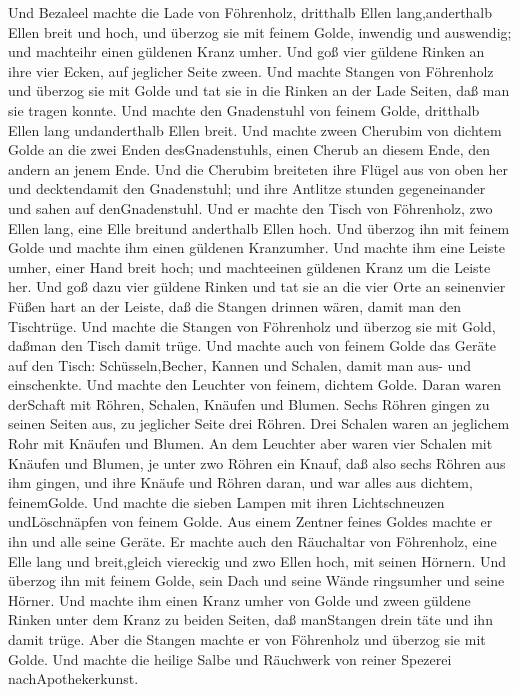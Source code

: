  Und Bezaleel machte die Lade von Föhrenholz, dritthalb
Ellen lang,anderthalb Ellen breit und hoch,  und überzog sie
mit feinem Golde, inwendig und auswendig; und machteihr einen güldenen
Kranz umher.  Und goß vier güldene Rinken an ihre vier
Ecken, auf jeglicher Seite zween.  Und machte Stangen von
Föhrenholz und überzog sie mit Golde  und tat sie in die
Rinken an der Lade Seiten, daß man sie tragen konnte.  Und
machte den Gnadenstuhl von feinem Golde, dritthalb Ellen lang
undanderthalb Ellen breit.  Und machte zween Cherubim von
dichtem Golde an die zwei Enden desGnadenstuhls,  einen
Cherub an diesem Ende, den andern an jenem Ende.  Und die
Cherubim breiteten ihre Flügel aus von oben her und decktendamit den
Gnadenstuhl; und ihre Antlitze stunden gegeneinander und sahen auf
denGnadenstuhl.  Und er machte den Tisch von Föhrenholz,
zwo Ellen lang, eine Elle breitund anderthalb Ellen hoch. 
Und überzog ihn mit feinem Golde und machte ihm einen güldenen
Kranzumher.  Und machte ihm eine Leiste umher, einer Hand
breit hoch; und machteeinen güldenen Kranz um die Leiste her.
 Und goß dazu vier güldene Rinken und tat sie an die vier
Orte an seinenvier Füßen  hart an der Leiste, daß die
Stangen drinnen wären, damit man den Tischtrüge.  Und
machte die Stangen von Föhrenholz und überzog sie mit Gold, daßman den
Tisch damit trüge.  Und machte auch von feinem Golde das
Geräte auf den Tisch: Schüsseln,Becher, Kannen und Schalen, damit man
aus- und einschenkte.  Und machte den Leuchter von feinem,
dichtem Golde. Daran waren derSchaft mit Röhren, Schalen, Knäufen und
Blumen.  Sechs Röhren gingen zu seinen Seiten aus, zu
jeglicher Seite drei Röhren.  Drei Schalen waren an
jeglichem Rohr mit Knäufen und Blumen.  An dem Leuchter
aber waren vier Schalen mit Knäufen und Blumen,  je unter
zwo Röhren ein Knauf, daß also sechs Röhren aus ihm gingen,
 und ihre Knäufe und Röhren daran, und war alles aus
dichtem, feinemGolde.  Und machte die sieben Lampen mit
ihren Lichtschneuzen undLöschnäpfen von feinem Golde.  Aus
einem Zentner feines Goldes machte er ihn und alle seine Geräte.
 Er machte auch den Räuchaltar von Föhrenholz, eine Elle
lang und breit,gleich viereckig und zwo Ellen hoch, mit seinen Hörnern.
 Und überzog ihn mit feinem Golde, sein Dach und seine
Wände ringsumher und seine Hörner. Und machte ihm einen Kranz umher von
Golde  und zween güldene Rinken unter dem Kranz zu beiden
Seiten, daß manStangen drein täte und ihn damit trüge. 
Aber die Stangen machte er von Föhrenholz und überzog sie mit Golde.
 Und machte die heilige Salbe und Räuchwerk von reiner
Spezerei nachApothekerkunst.


